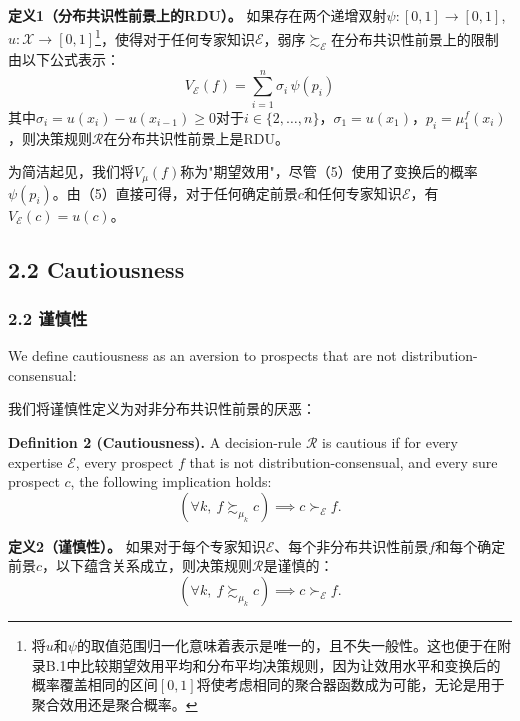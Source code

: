 \documentclass[12pt,a4paper]{article}
\newenvironment{original}
  {\par\noindent\ignorespaces}
  {\par}
\newenvironment{translation}
  {\par\noindent{\color{transblue}\ignorespaces}}
  {\par\medskip}
\begin{document}
\begin{translation}
\textbf{定义1（分布共识性前景上的RDU）。} 如果存在两个递增双射$\psi: [0,1] \to [0,1]$, $u: \mathcal{X} \to [0,1]$\footnote{将$u$和$\psi$的取值范围归一化意味着表示是唯一的，且不失一般性。这也便于在附录B.1中比较期望效用平均和分布平均决策规则，因为让效用水平和变换后的概率覆盖相同的区间$[0,1]$将使考虑相同的聚合器函数成为可能，无论是用于聚合效用还是聚合概率。}，使得对于任何专家知识$\mathcal{E}$，弱序$\succsim_{\mathcal{E}}$在分布共识性前景上的限制由以下公式表示：
\[
V_{\mathcal{E}}(f) = \sum_{i=1}^{n} \sigma_{i} \, \psi(p_{i}) \tag{5}
\]
其中$\sigma_{i} = u(x_{i}) - u(x_{i-1}) \geq 0$对于$i \in \{2, \dots, n\}$，$\sigma_{1} = u(x_{1})$，$p_{i} = \mu_{1}^{f}(x_{i})$，则决策规则$\mathcal{R}$在分布共识性前景上是RDU。

为简洁起见，我们将$V_{\mu}(f)$称为"期望效用"，尽管（5）使用了变换后的概率$\psi(p_{i})$。由（5）直接可得，对于任何确定前景$c$和任何专家知识$\mathcal{E}$，有$V_{\mathcal{E}}(c) = u(c)$。
\end{translation}

\subsection{2.2 Cautiousness}
{\color{transblue}\subsubsection*{2.2 谨慎性}}

\begin{original}
We define cautiousness as an aversion to prospects that are not distribution-consensual:
\end{original}

\begin{translation}
我们将谨慎性定义为对非分布共识性前景的厌恶：
\end{translation}

\begin{original}
\textbf{Definition 2 (Cautiousness).} A decision-rule $\mathcal{R}$ is cautious if for every expertise $\mathcal{E}$, every prospect $f$ that is not distribution-consensual, and every sure prospect $c$, the following implication holds:
\[
(\forall k,\ f \succsim_{\mu_{k}} c) \implies c \succ_{\mathcal{E}} f.
\]
\end{original}

\begin{translation}
\textbf{定义2（谨慎性）。} 如果对于每个专家知识$\mathcal{E}$、每个非分布共识性前景$f$和每个确定前景$c$，以下蕴含关系成立，则决策规则$\mathcal{R}$是谨慎的：
\[
(\forall k,\ f \succsim_{\mu_{k}} c) \implies c \succ_{\mathcal{E}} f.
\]
\end{translation}
\end{document}
